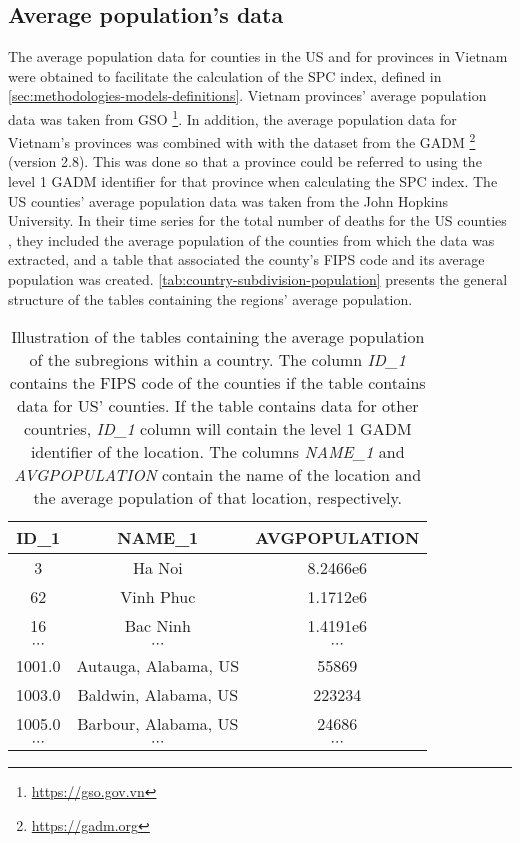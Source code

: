 \subsection{Average population's data}

The average population data for counties in the \gls{US} and for provinces in Vietnam were obtained to facilitate the calculation of the \gls{SPC} index, defined in \autoref{sec:methodologies-models-definitions}.
Vietnam provinces' average population data was taken from \gls{GSO} \footnote{\url{https://gso.gov.vn}}.
In addition, the average population data for Vietnam's provinces was combined with with the dataset from the \gls{GADM} \footnote{\url{https://gadm.org}} (version 2.8).
This was done so that a province could be referred to using the level 1 \gls{GADM} identifier for that province when calculating the \gls{SPC} index.
The \gls{US} counties' average population data was taken from the John Hopkins University.
In their time series for the total number of deaths for the \gls{US} counties \cite{dongInteractiveWebbasedDashboard2020}, they included the average population of the counties from which the data was extracted, and a table that associated the county's \gls{FIPS} code and its average population was created.
\autoref{tab:country-subdivision-population} presents the general structure of the tables containing the regions' average population.

\begin{table}[h]
\centering
\begin{tabular}{| c | c | c |}
    ID\_1 & NAME\_1 & AVGPOPULATION \\
    \hline\hline
    3 & Ha Noi & 8.2466e6 \\
    \hline
    62 & Vinh Phuc & 1.1712e6 \\
    \hline
    16 & Bac Ninh & 1.4191e6 \\
    \hline
    $\cdots$ & $\cdots$ & $\cdots$ \\
    \hline
    1001.0 & Autauga, Alabama, US & 55869 \\
    \hline
    1003.0 & Baldwin, Alabama, US & 223234 \\
    \hline
    1005.0 & Barbour, Alabama, US & 24686 \\
    \hline
    $\cdots$ & $\cdots$ & $\cdots$ \\
\end{tabular}
\caption[John Hopkins US population dataset structure]{Illustration of the tables containing the average population of the subregions within a country. The column \textit{ID\_1} contains the FIPS code of the counties if the table contains data for US' counties. If the table contains data for other countries, \textit{ID\_1} column will contain the level 1 GADM identifier of the location. The columns \textit{NAME\_1} and \textit{AVGPOPULATION} contain the name of the location and the average population of that location, respectively.}
\label{tab:country-subdivision-population}
\end{table}